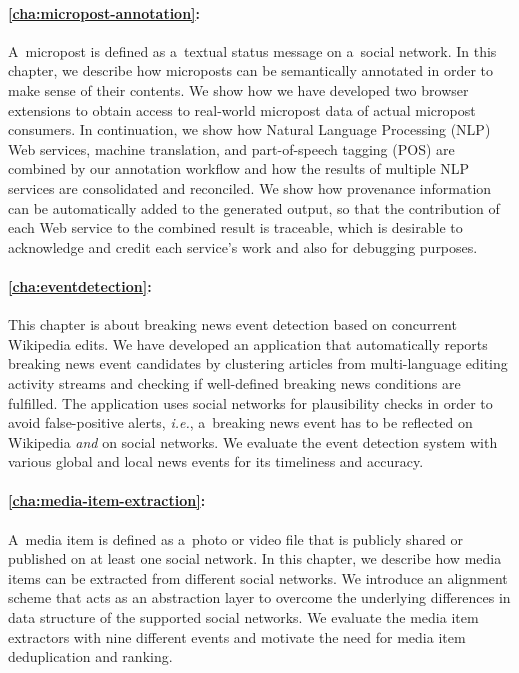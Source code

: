 \paragraph{\autoref{cha:micropost-annotation}:}

A~micropost is defined as a~textual status message
on a~social network.
In this chapter, we describe how microposts can be semantically annotated
in order to make sense of their contents.
We show how we have developed two browser extensions to obtain access
to real-world micropost data of actual micropost consumers.
In continuation, we show how Natural Language Processing (NLP)
Web services, machine translation, and part-of-speech tagging (POS)
are combined by our annotation workflow
and how the results of multiple NLP services are consolidated and reconciled.
We show how provenance information can be automatically added
to the generated output, so that the contribution
of each Web service to the combined result is traceable,
which is desirable to acknowledge and credit each service's work
and also for debugging purposes.

\paragraph{\autoref{cha:eventdetection}:}

This chapter is about breaking news event detection
based on concurrent Wikipedia edits.
We have developed an application that automatically
reports breaking news event candidates by clustering
articles from multi-language editing activity streams
and checking if well-defined breaking news conditions are fulfilled.
The application uses social networks for plausibility checks
in order to avoid false-positive alerts,
\emph{i.e.}, a~breaking news event has to be reflected on Wikipedia
\emph{and} on social networks.
We evaluate the event detection system with various
global and local news events for its timeliness and accuracy.

\paragraph{\autoref{cha:media-item-extraction}:}

A~media item is defined as
a~photo or video file that is publicly shared or published
on at least one social network.
In this chapter, we describe how media items can be extracted
from different social networks.
We introduce an alignment scheme that acts as an abstraction layer
to overcome the underlying differences in data structure of
the supported social networks.
We evaluate the media item extractors with nine different events
and motivate the need for media item deduplication and ranking.

